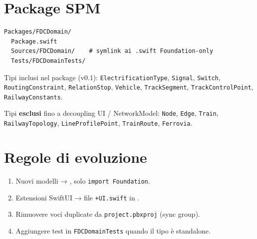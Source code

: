 \section{Package SPM}

\begin{lstlisting}
Packages/FDCDomain/
  Package.swift
  Sources/FDCDomain/    # symlink ai .swift Foundation-only
  Tests/FDCDomainTests/
\end{lstlisting}

Tipi inclusi nel package (v0.1):
\texttt{ElectrificationType}, \texttt{Signal}, \texttt{Switch},
\texttt{RoutingConstraint}, \texttt{RelationStop}, \texttt{Vehicle},
\texttt{TrackSegment}, \texttt{TrackControlPoint}, \texttt{RailwayConstants}.

Tipi \textbf{esclusi} fino a decoupling UI / NetworkModel:
\texttt{Node}, \texttt{Edge}, \texttt{Train}, \texttt{RailwayTopology},
\texttt{LineProfilePoint}, \texttt{TrainRoute}, \texttt{Ferrovia}.

\section{Regole di evoluzione}

\begin{enumerate}
  \item Nuovi modelli → , solo \texttt{import Foundation}.
  \item Estensioni SwiftUI → file \texttt{+UI.swift} in .
  \item Rimuovere voci duplicate da \texttt{project.pbxproj} (sync group).
  \item Aggiungere test in \texttt{FDCDomainTests} quando il tipo è standalone.
\end{enumerate}
